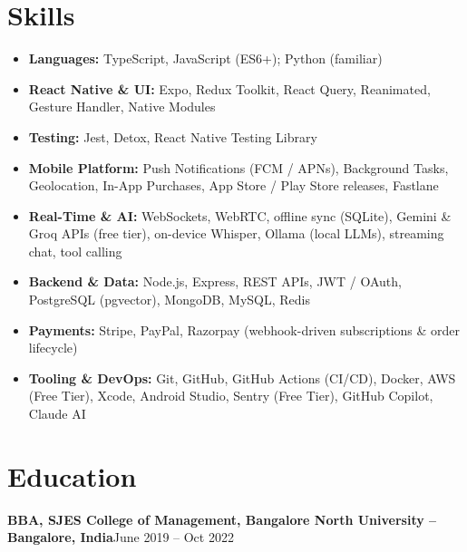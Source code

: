 \documentclass[a4paper,10pt]{article}
\newcommand{\entry}[2]{%
  \noindent\textbf{#1}\hfill{#2}\par
}
\begin{document}
\section{Skills}
\begin{itemize}[label={},leftmargin=0pt,itemsep=1.5pt]
  \item \textbf{Languages:} TypeScript, JavaScript (ES6+); Python (familiar)
  \item \textbf{React Native \& UI:} Expo, Redux Toolkit, React Query, Reanimated, Gesture Handler, Native Modules
  \item \textbf{Testing:} Jest, Detox, React Native Testing Library
  \item \textbf{Mobile Platform:} Push Notifications (FCM / APNs), Background Tasks, Geolocation, In-App Purchases, App Store / Play Store releases, Fastlane
  \item \textbf{Real-Time \& AI:} WebSockets, WebRTC, offline sync (SQLite), Gemini \& Groq APIs (free tier), on-device Whisper, Ollama (local LLMs), streaming chat, tool calling
  \item \textbf{Backend \& Data:} Node.js, Express, REST APIs, JWT / OAuth, PostgreSQL (pgvector), MongoDB, MySQL, Redis
  \item \textbf{Payments:} Stripe, PayPal, Razorpay (webhook-driven subscriptions \& order lifecycle)
\item \textbf{Tooling \& DevOps:} Git, GitHub, GitHub Actions (CI/CD), Docker, AWS (Free Tier), Xcode, Android Studio, Sentry (Free Tier), GitHub Copilot, Claude AI\end{itemize}

\section{Education}
\entry{BBA, SJES College of Management, Bangalore North University -- Bangalore, India}{June 2019 -- Oct 2022}
\end{document}
